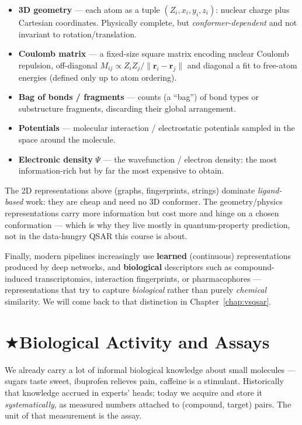 \documentclass[11pt, oneside]{book}
\makeatletter
\newcommand{\starglyph}{\textcolor{stargold}{\ensuremath{\bigstar}}}
\newcommand{\starsec}[1]{%
  \texorpdfstring{\starglyph\hspace{0.4em}\textcolor{star@frame}{#1}}{#1}}
\makeatother
\begin{document}
\begin{itemize}
  \item \textbf{3D geometry} --- each atom as a tuple $(Z_i, x_i, y_i, z_i)$:
        nuclear charge plus Cartesian coordinates. Physically complete, but
        \emph{conformer-dependent} and not invariant to rotation/translation.
  \item \textbf{Coulomb matrix} --- a fixed-size square matrix encoding nuclear
        Coulomb repulsion, off-diagonal
        $M_{ij}\propto Z_iZ_j/\lVert\mathbf{r}_i-\mathbf{r}_j\rVert$ and diagonal a
        fit to free-atom energies (defined only up to atom ordering).
  \item \textbf{Bag of bonds / fragments} --- counts (a ``bag'') of bond types or
        substructure fragments, discarding their global arrangement.
  \item \textbf{Potentials} --- molecular interaction / electrostatic potentials
        sampled in the space around the molecule.
  \item \textbf{Electronic density} $\Psi$ --- the wavefunction / electron density:
        the most information-rich but by far the most expensive to obtain.
\end{itemize}

\begin{intbox}
The 2D representations above (graphs, fingerprints, strings) dominate
\emph{ligand-based} work: they are cheap and need no 3D conformer. The
geometry/physics representations carry more information but cost more and hinge on
a chosen conformation --- which is why they live mostly in quantum-property
prediction, not in the data-hungry QSAR this course is about.
\end{intbox}

Finally, modern pipelines increasingly use \textbf{learned} (continuous)
representations produced by deep networks, and \textbf{biological} descriptors
such as compound-induced transcriptomics, interaction fingerprints, or
pharmacophores --- representations that try to capture \emph{biological} rather
than purely \emph{chemical} similarity. We will come back to that distinction
in Chapter~\ref{chap:vsqsar}.

\section{\starsec{Biological Activity and Assays}}
We already carry a lot of informal biological knowledge about small molecules ---
sugars taste sweet, ibuprofen relieves pain, caffeine is a stimulant. Historically
that knowledge accrued in experts' heads; today we acquire and store it
\emph{systematically}, as measured numbers attached to (compound, target) pairs.
The unit of that measurement is the assay.
\end{document}
